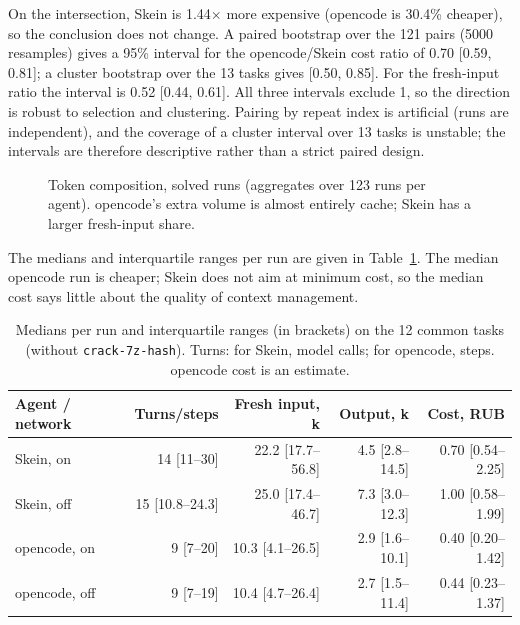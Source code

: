 \documentclass[11pt,a4paper]{article}
\begin{document}
On the intersection, Skein is 1.44$\times$ more expensive (opencode is 30.4\% cheaper), so the
conclusion does not change. A paired bootstrap over the 121 pairs (5000 resamples) gives a 95\%
interval for the opencode/Skein cost ratio of 0.70 [0.59, 0.81]; a cluster bootstrap over the 13
tasks gives [0.50, 0.85]. For the fresh-input ratio the interval is 0.52 [0.44, 0.61]. All three
intervals exclude 1, so the direction is robust to selection and clustering. Pairing by repeat
index is artificial (runs are independent), and the coverage of a cluster interval over 13 tasks
is unstable; the intervals are therefore descriptive rather than a strict paired design.

\begin{figure}[t]
\centering
{}
\caption{Token composition, solved runs (aggregates over 123 runs per agent). opencode's extra
volume is almost entirely cache; Skein has a larger fresh-input share.}
\label{fig:tokens}
\end{figure}

The medians and interquartile ranges per run are given in Table~\ref{tab:medians}. The median
opencode run is cheaper; Skein does not aim at minimum cost, so the median cost says little
about the quality of context management.

\begin{table}[t]
\centering
\small
\caption{Medians per run and interquartile ranges (in brackets) on the 12 common tasks (without
\texttt{crack-7z-hash}). Turns: for Skein, model calls; for opencode, steps. opencode cost is an
estimate.}
\label{tab:medians}
\begin{tabular}{@{}lrrrr@{}}
\toprule
Agent / network & Turns/steps & Fresh input, k & Output, k & Cost, RUB \\
\midrule
Skein, on & 14 [11--30] & 22.2 [17.7--56.8] & 4.5 [2.8--14.5] & 0.70 [0.54--2.25] \\
Skein, off & 15 [10.8--24.3] & 25.0 [17.4--46.7] & 7.3 [3.0--12.3] & 1.00 [0.58--1.99] \\
opencode, on & 9 [7--20] & 10.3 [4.1--26.5] & 2.9 [1.6--10.1] & 0.40 [0.20--1.42] \\
opencode, off & 9 [7--19] & 10.4 [4.7--26.4] & 2.7 [1.5--11.4] & 0.44 [0.23--1.37] \\
\bottomrule
\end{tabular}
\end{table}
\end{document}
